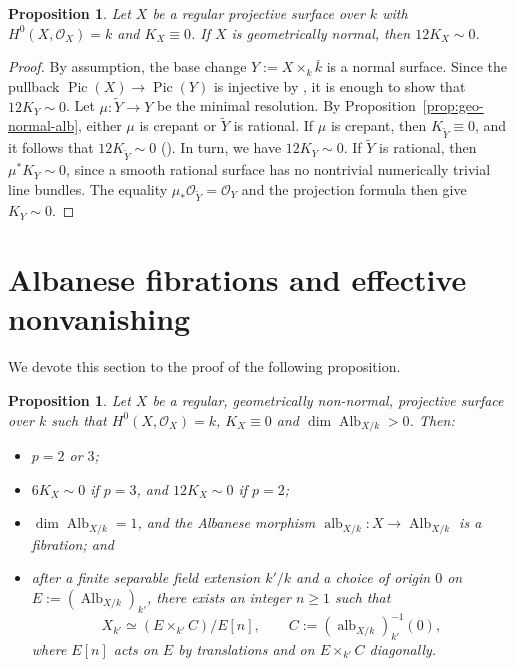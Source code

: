 \documentclass[10pt,abstract=true]{scrartcl}
\numberwithin{equation}{section}
\newtheorem{proposition}[theorem]{Proposition}
\theoremstyle{definition}
\theoremstyle{remark}
\DeclareMathOperator\Alb{Alb}
\DeclareMathOperator\alb{alb}
\begin{document}
\begin{proposition}\label{prop:geo-normal}
  Let $X$ be a regular projective surface over $k$ with $H^0(X,\mathcal O_X)=k$ and $K_X \equiv 0$.
  If $X$ is geometrically normal, then $12 K_X \sim 0$.
\end{proposition}
\begin{proof}
  By assumption, the base change $Y := X \times_k \bar k$ is a normal surface.
  Since the pullback $\operatorname{Pic}(X)\to\operatorname{Pic}(Y)$ is injective by \cite[Tag~\href{https://stacks.math.columbia.edu/tag/0CC5}{0CC5}]{StacksProject}, it is enough to show that $12 K_Y \sim 0$.
  Let $\mu\colon\widetilde Y\to Y$ be the minimal resolution.
  By Proposition~\ref{prop:geo-normal-alb}, either $\mu$ is crepant or $\widetilde Y$ is rational.
  If $\mu$ is crepant, then $K_{\widetilde Y} \equiv 0$, and it follows that $12 K_{\widetilde Y} \sim 0$ (\cite{BM-II,BM-III}).
  In turn, we have $12 K_Y \sim 0$.
  If $\widetilde Y$ is rational, then $\mu^*K_Y\sim 0$, since a smooth rational surface has no nontrivial numerically trivial line bundles.
  The equality $\mu_*\mathcal O_{\widetilde Y}=\mathcal O_Y$ and the projection formula then give $K_Y\sim 0$.
\end{proof}

\section{Albanese fibrations and effective nonvanishing}\label{sec:caseB}\label{sec:caseB-proof}%
We devote this section to the proof of the following proposition.

\begin{proposition}\label{prop:a_X-surjective}%
  Let $X$ be a regular, geometrically non-normal, projective surface over $k$ such that $H^0(X,\mathcal O_X) = k$, $K_X \equiv 0$ and $\dim \Alb_{X/k} > 0$.
  Then:
  \begin{itemize}
    \item[\textup{(1)}] $p=2$ or $3$;
    \item[\textup{(2)}] $6K_X \sim 0$ if $p=3$, and $12K_X \sim 0$ if $p=2$;
    \item[\textup{(3)}] $\dim \Alb_{X/k} = 1$, and the Albanese morphism $\alb_{X/k}\colon X\to\Alb_{X/k}$ is a fibration; and
    \item[\textup{(4)}] after a finite separable field extension $k'/k$ and a choice of origin $0$ on $E:=(\Alb_{X/k})_{k'}$, there exists an integer $n\geq1$ such that
      \[
        X_{k'}\simeq(E\times_{k'}C)/E[n],
        \qquad C:=(\alb_{X/k})_{k'}^{-1}(0),
      \]
      where $E[n]$ acts on $E$ by translations and on $E\times_{k'}C$ diagonally.
  \end{itemize}
\end{proposition}
\end{document}
